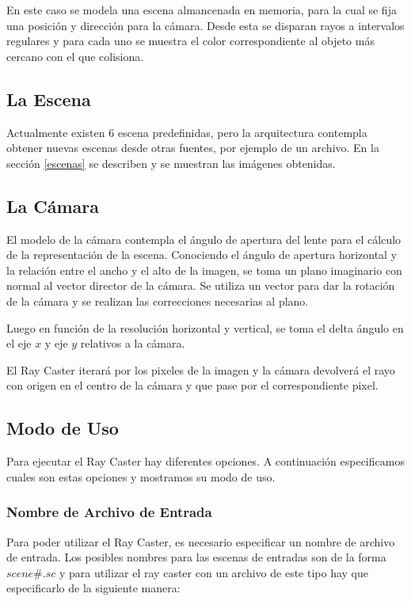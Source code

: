 \documentclass[a4paper,10pt]{article}
\begin{document}
En este caso se modela una escena almancenada en memoria, para la cual se fija una posici\'on y direcci\'on para la c\'amara.  Desde esta se disparan rayos a intervalos regulares y para cada uno se muestra el color correspondiente al objeto m\'as cercano con el que colisiona.

\subsection{La Escena}

Actualmente existen $6$ escena predefinidas, pero la arquitectura contempla obtener nuevas escenas desde otras fuentes, por ejemplo de
un archivo. En la secci\'on \ref{escenas} se describen y se muestran las im\'agenes obtenidas.

\subsection{La C\'amara}

El modelo de la c\'amara contempla el \'angulo de apertura del lente para el c\'alculo de la representaci\'on de la escena.
Conociendo el \'angulo de apertura horizontal y la relaci\'on entre el ancho y el alto de la imagen, se toma un plano imaginario
con normal al vector director de la c\'amara. Se utiliza un vector para dar la rotaci\'on de la c\'amara y se realizan las correcciones
necesarias al plano.

Luego en funci\'on de la resoluci\'on horizontal y vertical, se toma el delta \'angulo en el eje $x$ y eje $y$ relativos a la c\'amara.

El Ray Caster iterar\'a por los pixeles de la imagen y la c\'amara devolver\'a el rayo con origen en el centro de la c\'amara y que
pase por el correspondiente pixel.

\subsection{Modo de Uso}
Para ejecutar el Ray Caster hay diferentes opciones.  A continuaci\'on especificamos cuales son estas opciones y mostramos su modo de uso.

\subsubsection{Nombre de Archivo de Entrada}
Para poder utilizar el Ray Caster, es necesario especificar un nombre de archivo de entrada.  Los posibles nombres para las escenas de entradas son de la forma $scene\#.sc$ y para utilizar el ray caster con un archivo de este tipo hay que especificarlo de la siguiente manera:
\end{document}
